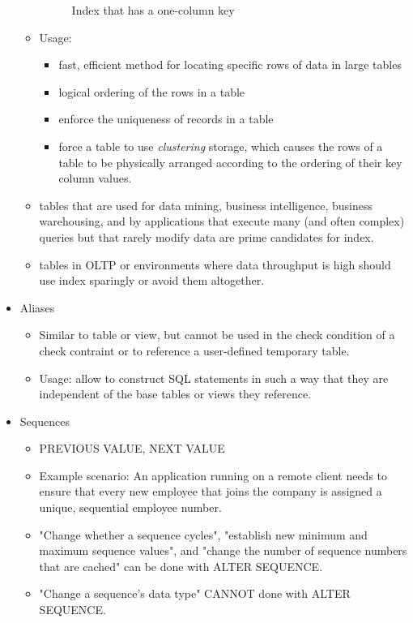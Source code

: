 \documentclass{article}
\begin{document}
\begin{itemize}
\begin{itemize}
\begin{figure}[h]
		\caption{Index that has a one-column key}
		\label{workloads}
		\end{figure}	
	\item Usage:
		\begin{itemize}
		\item fast, efficient method for locating specific rows of data in large tables
		\item logical ordering of the rows in a table
		\item enforce the uniqueness of records in a table
		\item force a table to use \textit{clustering} storage, which causes the rows of a table to be 
		physically arranged according to the ordering of their key column values.
		\end{itemize}
	\item tables that are used for data mining, business intelligence, business warehousing, and by
	applications that execute many (and often complex) queries but that rarely modify data are prime 
	candidates for index.
	\item tables in OLTP or environments where data throughput is high should use index sparingly or
	avoid them altogether.
	\end{itemize}
\item Aliases
	\begin{itemize}
	\item Similar to table or view, but cannot be used in the check condition of a check contraint
	or to reference a user-defined temporary table.
	\item Usage: allow to construct SQL statements in such a way that they are independent of the base
	tables or views they reference.
	\end{itemize}
\item Sequences
	\begin{itemize}
	\item PREVIOUS VALUE, NEXT VALUE
	\item Example scenario: An application running on a remote client needs to ensure that every new employee that joins the 
	company is assigned a unique, sequential employee number.
	\item "Change whether a sequence cycles", "establish new minimum and maximum sequence values", and "change the number of sequence numbers that are cached" can be done
	with ALTER SEQUENCE.
	\item "Change a sequence's data type" CANNOT done with ALTER SEQUENCE.
	\end{itemize}

\end{itemize}
\end{document}
